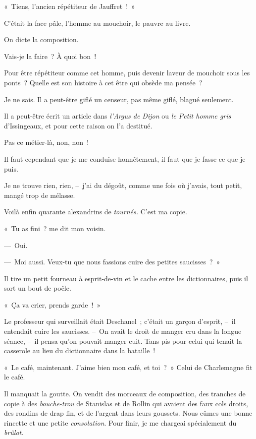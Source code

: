 \documentclass[french,twoside]{book} %
\begin{document}
« Tiens, l’ancien répétiteur de Jauffret ! »\par
C’était la face pâle, l’homme au mouchoir, le pauvre au livre.\par
\bigbreak
\noindent On dicte la composition.\par
Vais-je la faire ? À quoi bon !\par
Pour être répétiteur comme cet homme, puis devenir laveur de mouchoir sous les ponts ? Quelle est son histoire à cet être qui obsède ma pensée ?\par
Je ne sais. Il a peut-être giflé un censeur, pas même giflé, blagué seulement.\par
Il a peut-être écrit un article dans \emph{l’Argus de Dijon} ou \emph{le Petit homme gris} d’Issingeaux, et pour cette raison on l’a destitué.\par
Pas ce métier-là, non, non !\par
Il faut cependant que je me conduise honnêtement, il faut que je fasse ce que je puis.\par
\bigbreak
\noindent Je ne trouve rien, rien, – j’ai du dégoût, comme une fois où j’avais, tout petit, mangé trop de mélasse.\par
Voilà enfin quarante alexandrins de\emph{ tournés.} C’est ma copie.\par
« Tu as fini ? me dit mon voisin.\par
— Oui.\par
— Moi aussi. Veux-tu que nous fassions cuire des petites saucisses ? »\par
Il tire un petit fourneau à esprit-de-vin et le cache entre les dictionnaires, puis il sort un bout de poêle.\par
« Ça va crier, prends garde ! »\par
Le professeur qui surveillait était Deschanel ; c’était un garçon d’esprit, – il entendait cuire les saucisses. – On avait le droit de manger cru dans la longue séance, – il pensa qu’on pouvait manger cuit. Tans pis pour celui qui tenait la casserole au lieu du dictionnaire dans la bataille !\par
« Le café, maintenant. J’aime bien mon café, et toi ? » Celui de Charlemagne fit le café.\par
Il manquait la goutte. On vendit des morceaux de composition, des tranches de copie à des \emph{bouche-trou} de Stanislas et de Rollin qui avaient des faux cols droits, des rondins de drap fin, et de l’argent dans leurs goussets. Nous eûmes une bonne rincette et une petite \emph{consolation}. Pour finir, je me chargeai spécialement du \emph{brûlot}.\par
\end{document}

